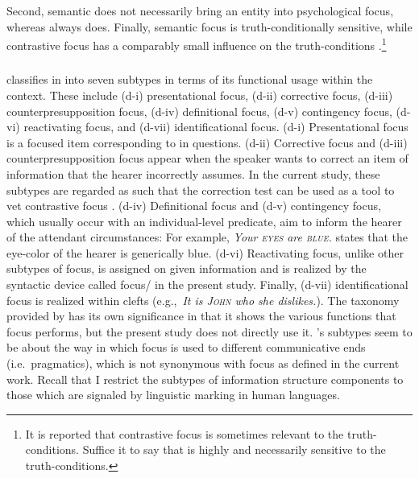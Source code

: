 


\noindent Second, semantic  does not necessarily bring an entity
into psychological focus, whereas  always
does. Finally, semantic focus is truth-conditionally
sensitive, while contrastive focus has a
comparably small influence on the truth-conditions
\citep{gundel:99}.\footnote{It is reported that contrastive focus is
  sometimes relevant to the truth-conditions. Suffice it to say that
   is highly and necessarily sensitive to the
  truth-conditions.}




\subsubsection{\citet{gussenhoven:07}}
\label{3:sssec:gussenhoven}



\citeauthor{gussenhoven:07} classifies  in  into seven
subtypes in terms of its functional usage within the context.  These
include (d-i) presentational focus, (d-ii) corrective focus, (d-iii)
counterpresupposition focus, (d-iv) definitional focus, (d-v)
contingency focus, (d-vi) reactivating focus, and (d-vii)
identificational focus.  (d-i) Presentational focus is a focused item
corresponding to  in questions. (d-ii)
Corrective focus and (d-iii) counterpresupposition focus appear when
the speaker wants to correct an item of information that the hearer
incorrectly assumes.  In the current study, these subtypes are
regarded as  such that the correction test can be
used as a tool to vet contrastive focus
\citep{gryllia:09}. (d-iv) Definitional focus and
(d-v) contingency focus, which usually occur with an individual-level
predicate, aim to inform the hearer of the attendant circumstances:
For example, \textit{Your \textsc{eyes} are \textsc{blue}.} states
that the eye-color of the hearer is generically blue.  (d-vi)
Reactivating focus, unlike other subtypes of focus, is assigned on
given information and is realized by the syntactic device called
focus/  in the present study.  Finally, (d-vii)
identificational focus \citep{kiss:98} is realized within clefts
(e.g.,\ \textit{It is \textsc{John} who she dislikes.}).
The taxonomy provided by \citeauthor{gussenhoven:07} has its own
significance in that it shows the various functions that focus
performs, but the present study does not directly use it.
\citeauthor{gussenhoven:07}'s subtypes seem to be about the way in
which focus is used to different communicative ends
(i.e.\ pragmatics), which is not synonymous with focus as defined in
the current work.  Recall that I restrict the subtypes of information
structure components to those which are signaled by linguistic marking
in human languages.




